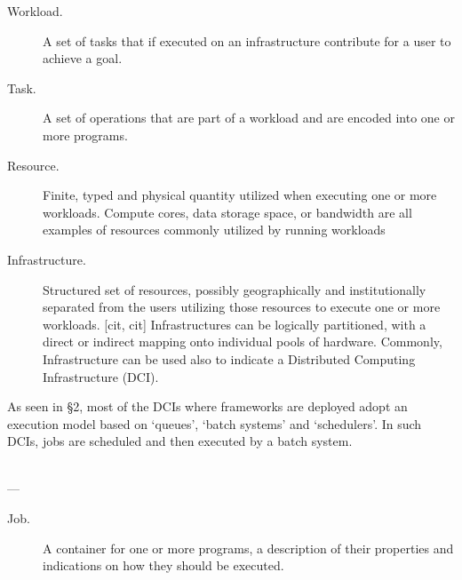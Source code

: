 \documentclass{sig-alternate}
\begin{document}
\begin{description}

\item[Workload.] A set of tasks that if executed on an infrastructure 
contribute for a user to achieve a goal.

\item[Task.] A set of operations that are part of a workload and are encoded
into one or more programs.


\item[Resource.] Finite, typed and physical quantity utilized when
  executing one or more workloads. Compute cores, data storage space,
  or bandwidth are all examples of resources commonly utilized by
  running workloads  

\item[Infrastructure.] Structured set of resources, possibly geographically and
institutionally separated from the users utilizing those resources to execute
one or more workloads. [cit, cit] Infrastructures can be logically partitioned,
with a direct or indirect mapping onto individual pools of hardware. Commonly,
Infrastructure can be used also to indicate a Distributed Computing
Infrastructure (DCI). \end{description}

As seen in \S2, most of the DCIs where \pilotjobs frameworks are
deployed adopt an execution model based on `queues', `batch systems'
and `schedulers'. In such DCIs, jobs are scheduled and then executed
by a batch system. 

 
  \\---\\

\begin{description}
\item[Job.] A container for one or more programs, a description of their properties and indications on how they should be executed.
\end{description}
\end{document}
